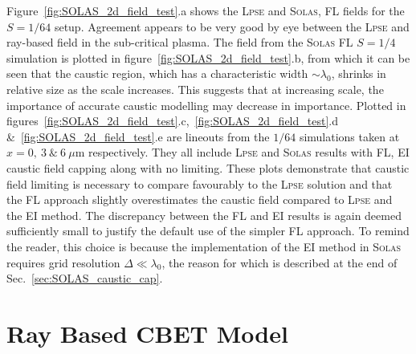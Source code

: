 Figure~\ref{fig:SOLAS_2d_field_test}.a shows the \textsc{Lpse} and \textsc{Solas}, \ac{FL} fields for the $S=1/64$ setup.
Agreement appears to be very good by eye between the \textsc{Lpse} and ray-based field in the sub-critical plasma.
The field from the \textsc{Solas} \ac{FL} $S=1/4$ simulation is plotted in figure~\ref{fig:SOLAS_2d_field_test}.b, from which it can be seen that the caustic region, which has a characteristic width $\sim\lambda_0$, shrinks in relative size as the scale increases.
This suggests that at increasing scale, the importance of accurate caustic modelling may decrease in importance.
Plotted in figures~\ref{fig:SOLAS_2d_field_test}.c,~\ref{fig:SOLAS_2d_field_test}.d \&~\ref{fig:SOLAS_2d_field_test}.e are lineouts from the $1/64$ simulations taken at $x=0,\ 3\ \text{\&}\ 6\ \mu\text{m}$ respectively.
They all include \textsc{Lpse} and \textsc{Solas} results with \ac{FL}, \ac{EI} caustic field capping along with no limiting.
These plots demonstrate that caustic field limiting is necessary to compare favourably to the \textsc{Lpse} solution and that the \ac{FL} approach slightly overestimates the caustic field compared to \textsc{Lpse} and the \ac{EI} method.
The discrepancy between the \ac{FL} and \ac{EI} results is again deemed sufficiently small to justify the default use of the simpler \ac{FL} approach.
To remind the reader, this choice is because the implementation of the \ac{EI} method in \textsc{Solas} requires grid resolution $\Delta\ll\lambda_0$, the reason for which is described at the end of Sec.~\ref{sec:SOLAS_caustic_cap}.

\section{Ray Based CBET Model}


